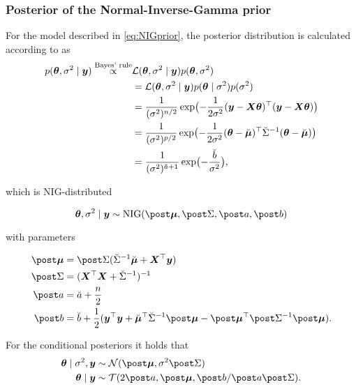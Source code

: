 \subsubsection*{Posterior of the Normal-Inverse-Gamma prior}
For the model described in \eqref{eq:NIGprior}, the posterior distribution is calculated according to \citet{fahrmeir_regression_2021} as
\begin{equation*}
    \begin{aligned}
        p(\bm{\theta}, \sigma^2 \mid \bm{y}) \overset{\text{Bayes' rule}}{\propto}& \mathcal{L}(\bm{\theta}, \sigma^2 \mid \bm{y}) p(\bm{\theta}, \sigma^2) \\
        &= \mathcal{L}(\bm{\theta}, \sigma^2 \mid \bm{y}) p(\bm{\theta} \mid \sigma^2) p(\sigma^2) \\
        &= \frac{1}{(\sigma^2)^{n/2}} \exp\bigl( - \frac{1}{2\sigma^2} (\bm{y} - \bm{X} \bm{\theta})^\top(\bm{y} - \bm{X} \bm{\theta}) \bigr)\\
        &= \frac{1}{(\sigma^2)^{p/2}} \exp\bigl( - \frac{1}{2\sigma^2} (\bm{\theta} - \breve{\bm{\mu}})^\top \breve{\Sigma}^{-1} (\bm{\theta} - \breve{\bm{\mu}}) \bigr)\\
        &= \frac{1}{(\sigma^2)^{\breve{a} + 1}} \exp\bigl( - \frac{\breve{b}}{\sigma^2} \bigr),
    \end{aligned}
\end{equation*}

which is NIG-distributed

\begin{equation*}
    \btheta, \ssd \mid \by \sim \text{NIG}(\mupo, \Sdpo, \apo, \bpo)
\end{equation*}

with parameters

\begin{equation*}
    \begin{aligned}
        \mupo &= \Sdpo (\Sdipri \mupri + \bX^\top \by) \\
        \Sdpo &= (\bX^\top \bX + \Sdipri)^{-1} \\
        \apo &= \apri + \frac{n}{2}\\
        \bpo &= \bpri + \frac{1}{2} ( \by^\top \by + \mupri^\top \Sdipri \mupo - \mupo^\top \Sdipo \mupo).
    \end{aligned}
\end{equation*}

For the conditional posteriors it holds that
\begin{equation*}
    \begin{aligned}
        \btheta \mid \ssd, \by &\sim \Ncal(\mupo, \ssd \Sdpo) \\
        \btheta \mid \by &\sim \Tcal(2 \apo, \mupo, \bpo / \apo \Sdpo).
    \end{aligned}
\end{equation*}

